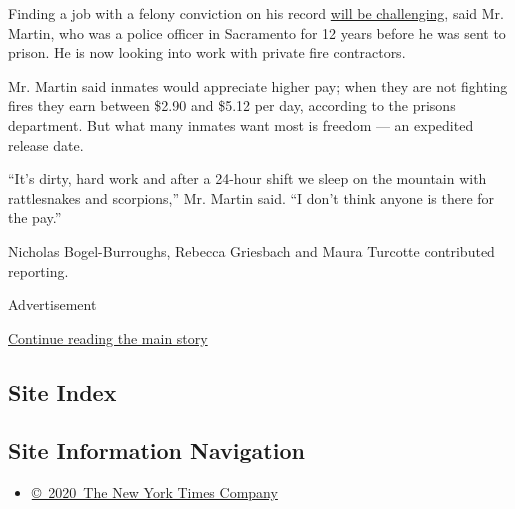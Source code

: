 Finding a job with a felony conviction on his record
\href{https://www.nytimes3xbfgragh.onion/2018/11/15/us/california-paying-inmates-fight-fires.html}{will
be challenging}, said Mr. Martin, who was a police officer in Sacramento
for 12 years before he was sent to prison. He is now looking into work
with private fire contractors.

Mr. Martin said inmates would appreciate higher pay; when they are not
fighting fires they earn between \$2.90 and \$5.12 per day, according to
the prisons department. But what many inmates want most is freedom ---
an expedited release date.

``It's dirty, hard work and after a 24-hour shift we sleep on the
mountain with rattlesnakes and scorpions,'' Mr. Martin said. ``I don't
think anyone is there for the pay.''

Nicholas Bogel-Burroughs, Rebecca Griesbach and Maura Turcotte
contributed reporting.

Advertisement

\protect\hyperlink{after-bottom}{Continue reading the main story}

\hypertarget{site-index}{%
\subsection{Site Index}\label{site-index}}

\hypertarget{site-information-navigation}{%
\subsection{Site Information
Navigation}\label{site-information-navigation}}

\begin{itemize}
\tightlist
\item
  \href{https://help.nytimes3xbfgragh.onion/hc/en-us/articles/115014792127-Copyright-notice}{©~2020~The
  New York Times Company}
\end{itemize}

